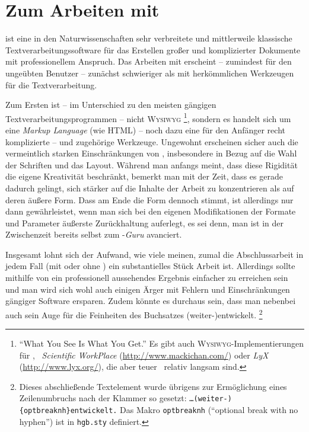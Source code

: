 \chapter{Zum Arbeiten mit \latex}
\label{cha:ArbeitenMitLatex}



\latex ist eine in den Naturwissenschaften sehr verbreitete
und mittlerweile klassische Textverarbeitungssoftware für das Erstellen
großer und komplizierter Dokumente mit professionellem Anspruch.
Das Arbeiten mit \latex erscheint -- zumindest für den ungeübten Benutzer -- %
zunächst schwieriger als mit herkömmlichen Werkzeugen für die
Textverarbeitung.

Zum Ersten ist -- im Unterschied zu den meisten gängigen
Text\-ver\-arbei\-tungs\-prog\-ram\-men -- \latex nicht \textsc{Wysiwyg}%
\footnote{"`What You See Is What You Get."' Es gibt auch 
\textsc{Wysiwyg}-Implementierungen für \latex, 
\zB\ \emph{Scientific WorkPlace} (\url{http://www.mackichan.com/}) oder
\emph{LyX} (\url{http://www.lyx.org/}), 
die aber teuer \bzw\ relativ langsam sind.},
sondern es handelt sich um eine \emph{Markup Lang\-uage} (wie HTML) -- noch dazu
eine für den Anfänger recht komplizierte -- und zugehörige Werkzeuge.
Ungewohnt erscheinen sicher auch die vermeintlich starken
Einschränkungen von \latex,
insbesondere in Bezug auf die Wahl der Schriften und das
Layout. Während man anfangs meint, dass diese Rigidität
die eigene Kreativität beschränkt, bemerkt man mit der Zeit, dass es gerade
dadurch gelingt, sich stärker auf die Inhalte der Arbeit zu
konzentrieren als auf deren äußere Form. Dass am Ende die Form dennoch stimmt,
ist allerdings nur dann gewährleistet, wenn man sich bei den eigenen Modifikationen
der Formate und Parameter äußerste Zurückhaltung auferlegt, es sei denn,
man ist in der Zwischenzeit bereits selbst zum \latex-\emph{Guru} avanciert.

Insgesamt lohnt sich der Aufwand, wie viele meinen, zumal die Abschlussarbeit
in jedem Fall (mit oder ohne \latex) ein substantielles Stück Arbeit ist.
Allerdings sollte mithilfe von \latex ein professionell aussehendes
Ergebnis einfacher zu erreichen sein und man wird sich wohl auch einigen
Ärger mit Fehlern und Einschränkungen gängiger Software ersparen.
Zudem könnte es durchaus sein, dass man nebenbei auch sein Auge für
die Feinheiten des Buchsatzes (weiter-){\optbreaknh}entwickelt.%
\footnote{Dieses abschließende Textelement wurde übrigens zur Ermöglichung eines 
Zeilenumbruchs nach der Klammer so gesetzt: \texttt{\ldots (weiter-)\{{\bs}optbreaknh\}entwickelt.}
Das Makro \texttt{{\bs}optbreaknh} ("`optional break with no hyphen"') ist in 
\texttt{hgb.sty} definiert.}


